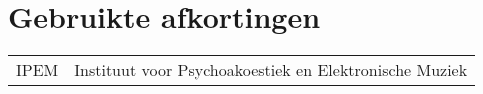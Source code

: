 \chapter{Gebruikte afkortingen}
\begin{flushleft}
	\renewcommand{\baselinestretch}{1.5}
	\small\normalsize
	\begin{longtable}{ll}
		IPEM				&  Instituut voor Psychoakoestiek en Elektronische Muziek \\
	\end{longtable}
\end{flushleft}